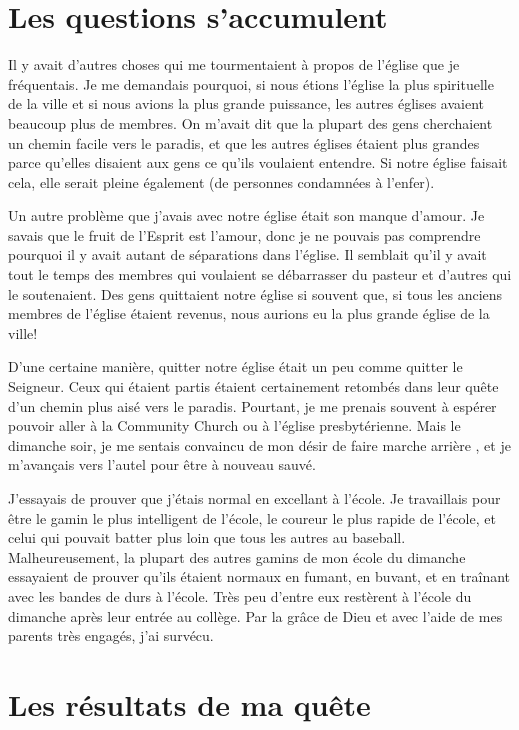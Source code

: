 \section{Les questions s'accumulent}

Il y avait d'autres choses qui me tourmentaient à propos de l'église que je fréquentais. Je me demandais pourquoi, si nous étions l'église la plus spirituelle de la ville et si nous avions la plus grande puissance, les autres églises avaient beaucoup plus de membres. On m'avait dit que la plupart des gens cherchaient un chemin facile vers le paradis, et que les autres églises étaient plus grandes parce qu'elles disaient aux gens ce qu'ils voulaient entendre. Si notre église faisait cela, elle serait pleine également (de personnes condamnées à l'enfer).

Un autre problème que j'avais avec notre église était son manque d'amour. Je savais que le fruit de l'Esprit est l'amour, donc je ne pouvais pas comprendre pourquoi il y avait autant de séparations dans l'église. Il semblait qu'il y avait tout le temps des membres qui voulaient se débarrasser du pasteur et d'autres qui le soutenaient. Des gens quittaient notre église si souvent que, si tous les anciens membres de l'église étaient revenus, nous aurions eu la plus grande église de la ville!

D'une certaine manière, quitter notre église était un peu comme quitter le Seigneur. Ceux qui étaient partis étaient certainement retombés dans leur quête d'un chemin plus aisé vers le paradis. Pourtant, je me prenais souvent à espérer pouvoir aller à la Community Church ou à l'église presbytérienne. Mais le dimanche soir, je me sentais convaincu de mon désir de \og faire marche arrière \fg{}, et je m'avançais vers l'autel pour être à nouveau \og sauvé. \fg{}

J'essayais de prouver que j'étais normal en excellant à l'école. Je travaillais pour être le gamin le plus intelligent de l'école, le coureur le plus rapide de l'école, et celui qui pouvait batter plus loin que tous les autres au baseball. Malheureusement, la plupart des autres gamins de mon école du dimanche essayaient de prouver qu'ils étaient normaux en fumant, en buvant, et en traînant avec les bandes de durs à l'école. Très peu d'entre eux restèrent à l'école du dimanche après leur entrée au collège. Par la grâce de Dieu et avec l'aide de mes parents très engagés, j'ai survécu.

\section{Les résultats de ma quête}

